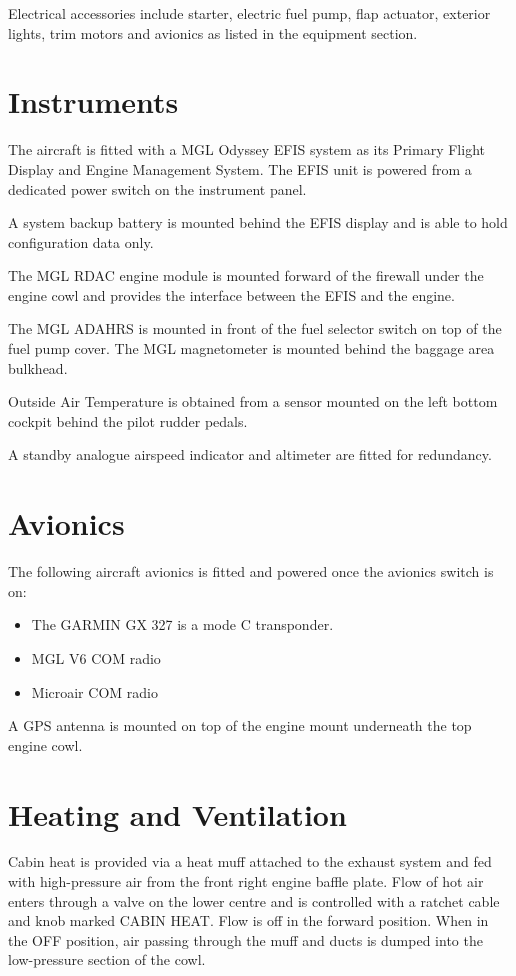 Electrical accessories include starter, electric fuel pump, flap actuator, exterior lights, trim motors and avionics
as listed in the equipment section.

\section{Instruments}
The aircraft is fitted with a MGL Odyssey EFIS system as its Primary Flight Display and Engine
Management System. The EFIS unit is powered from a dedicated power switch on the instrument panel.  

A system backup battery is mounted behind the EFIS display and is able to hold configuration data only.  

The MGL RDAC engine module is mounted forward of the firewall under the engine cowl and provides the interface between the EFIS and the engine. 

The MGL ADAHRS is mounted in front of the fuel selector switch on top of the fuel pump cover.  
The MGL magnetometer is mounted behind the baggage area bulkhead.  

Outside Air Temperature is obtained from a sensor mounted on the left bottom cockpit behind the pilot rudder pedals.

A standby analogue airspeed indicator and altimeter are fitted for redundancy.

\section{Avionics}
The following aircraft avionics is fitted and powered once the avionics switch is on:
\begin{itemize}
\item The GARMIN GX 327 is a mode C transponder.
\item MGL V6 COM radio
\item Microair COM radio
\end{itemize}

A GPS antenna is mounted on top of the engine mount underneath the top engine cowl.  

\section{Heating and Ventilation}
Cabin heat is provided via a heat muff attached to the exhaust system and fed with high-pressure air from the front
right engine baffle plate. Flow of hot air enters through a valve on the lower centre and is controlled with a
ratchet cable and knob marked CABIN HEAT. Flow is off in the forward position. When in the OFF position, air
passing through the muff and ducts is dumped into the low-pressure section of the cowl.

